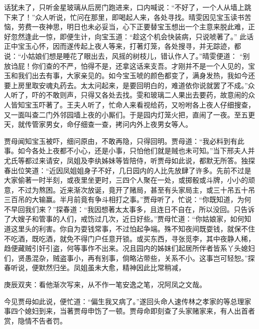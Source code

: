 \begin{parag}
    话犹未了，只听金星玻璃从后房门跑进来，口内喊说：“不好了，一个人从墙上跳下来了！”众人听说，忙问在那里，即喝起人来，各处寻找。晴雯因见宝玉读书苦恼，劳费一夜神思，明日也未必妥当，心下正要替宝玉想出一个主意来脱此难，正好忽然逢此一惊，即便生计，向宝玉道：“趁这个机会快装病，只说唬著了。” 此话正中宝玉心怀，因而遂传起上夜人等来，打著灯笼，各处搜寻，并无踪迹，都说：“小姑娘们想是睡花了眼出去，风摇的树枝儿，错认作人了。”晴雯便道： “别放诌屁！你们查的不严，怕得不是，还拿这话来支吾。才刚并不是一个人见的，宝玉和我们出去有事，大家亲见的。如今宝玉唬的颜色都变了，满身发热，我如今还要上房里取安魂丸药去。太太问起来，是要回明白的，难道依你说就罢了不成。”众人听了，吓的不敢则声，只得又各处去找。雯和玻璃二人果出去要药，故意闹的众人皆知宝玉吓著了。王夫人听了，忙命人来看视给药，又吩咐各上夜人仔细搜查，又一面叫查二门外邻园墙上夜的小厮们。于是园内灯笼火把，直闹了一夜。至五更天，就传管家男女，命仔细查一查，拷问内外上夜男女等人。
\end{parag}


\begin{parag}
    贾母闻知宝玉被吓，细问原由，不敢再隐，只得回明。贾母道：“我必料到有此事。如今各处上夜都不小心，还是小事，只怕他们就是贼也未可知。”当下邢夫人并尤氏等都过来请安，凤姐及李纨姊妹等皆陪侍，听贾母如此说，都默无所答。独探春出位笑道：“近因凤姐姐身子不好，几日园内的人比先放肆了许多。先前不过是大家偷著一时半刻，或夜里坐更时，三四个人聚在一处，或掷骰或斗牌，小小的顽意，不过为熬困。近来渐次放诞，竟开了赌局，甚至有头家局主，或三十吊五十吊三百吊的大输赢。半月前竟有争斗相打之事。”贾母听了，忙说：“你既知道，为何不早回我们来？”探春道：“我因想著太太事多，且连日不自在，所以没回。只告诉了大嫂子和管事的人们，戒饬过几次，近日好些。”贾母忙道：“你姑娘家，如何知道这里头的利害。你自为耍钱常事，不过怕起争端。殊不知夜间既耍钱，就保不住不吃酒，既吃酒，就免不得门户任意开锁。或买东西，寻张觅李，其中夜静人稀，趋便藏贼引奸引盗，何等事作不出来。况且园内的姊妹们起居所伴者皆系丫头媳妇们，贤愚混杂，贼盗事小，再有别事，倘略沾带些，关系不小。这事岂可轻恕。”探春听说，便默然归坐。凤姐虽未大愈，精神因此比常稍减，\begin{note}庚辰双夹：看他渐次写来，从不作一笔安逸之笔，况阿凤之文哉。\end{note}今见贾母如此说，便忙道：“偏生我又病了。”遂回头命人速传林之孝家的等总理家事四个媳妇到来，当著贾母申饬了一顿。贾母命即刻查了头家赌家来，有人出首者赏，隐情不告者罚。
\end{parag}


